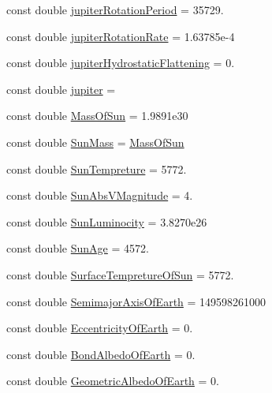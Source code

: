 \begin{DoxyCompactItemize}
\item 
const double \mbox{\hyperlink{namespace_e_g_x_phys_a21da3427de7c5f14c0c92f18d309ee21}{jupiter\+Rotation\+Period}} = 35729.
\item 
const double \mbox{\hyperlink{namespace_e_g_x_phys_a29c07eaf609dbad71821837ed2660543}{jupiter\+Rotation\+Rate}} = 1.\+63785e-\/4
\item 
const double \mbox{\hyperlink{namespace_e_g_x_phys_a7c18622d09bcb8cc8a7998ec1a453968}{jupiter\+Hydrostatic\+Flattening}} = 0.
\item 
const double \mbox{\hyperlink{namespace_e_g_x_phys_a82f61dffeb74af80a52a3bf5ed43eed0}{jupiter}} =
\item 
const double \mbox{\hyperlink{namespace_e_g_x_phys_a6e84ae13f1dbcecb215af787bbc12cd6}{Mass\+Of\+Sun}} = 1.\+9891e30
\item 
const double \mbox{\hyperlink{namespace_e_g_x_phys_a15b2187a46d73ac35fa7467b8fa6cb19}{Sun\+Mass}} = \mbox{\hyperlink{namespace_e_g_x_phys_a6e84ae13f1dbcecb215af787bbc12cd6}{Mass\+Of\+Sun}}
\item 
const double \mbox{\hyperlink{namespace_e_g_x_phys_a97be71e7f8ca4f7813362bc1dca66db5}{Sun\+Tempreture}} = 5772.
\item 
const double \mbox{\hyperlink{namespace_e_g_x_phys_a61266dc1aaacdd9a9bd0f2fa92aa21c9}{Sun\+Abs\+V\+Magnitude}} = 4.
\item 
const double \mbox{\hyperlink{namespace_e_g_x_phys_a3987543f6972eb72eb2c07d39520b43e}{Sun\+Luminocity}} = 3.\+8270e26
\item 
const double \mbox{\hyperlink{namespace_e_g_x_phys_a173216c099d7915fb16e6416902fcbb8}{Sun\+Age}} = 4572.
\item 
const double \mbox{\hyperlink{namespace_e_g_x_phys_a2e7bb27d65efea2fad0a879a36011ef2}{Surface\+Tempreture\+Of\+Sun}} = 5772.
\item 
const double \mbox{\hyperlink{namespace_e_g_x_phys_ad1bdca5cec4a0f4a4b8a18ead61de6d9}{Semimajor\+Axis\+Of\+Earth}} = 149598261000
\item 
const double \mbox{\hyperlink{namespace_e_g_x_phys_a327bbaf59d546f8524d6fb9da919d939}{Eccentricity\+Of\+Earth}} = 0.
\item 
const double \mbox{\hyperlink{namespace_e_g_x_phys_a932fff28fce4321fdbf9abc5c1783dc9}{Bond\+Albedo\+Of\+Earth}} = 0.
\item 
const double \mbox{\hyperlink{namespace_e_g_x_phys_aae01fb8ed365fc5de7acebeef34b7351}{Geometric\+Albedo\+Of\+Earth}} = 0.
\item 

\end{DoxyCompactItemize}
